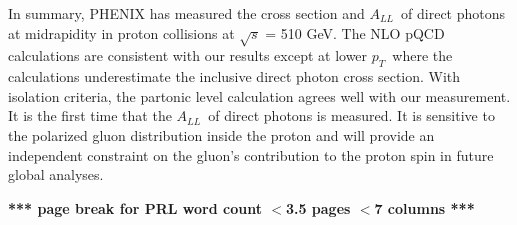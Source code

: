\documentclass[twocolumn,letterpaper,aps,prl,longbibliography,superscriptaddress,floatfix]{revtex4-2}
\newcommand{\pT}{\ensuremath{p_T}}
\newcommand{\ALL}{\ensuremath{A_{LL}}}
\begin{document}
In summary, PHENIX has measured the cross section and \ALL\ of direct photons at midrapidity in proton collisions at $\sqrt{s}$ = 510 GeV. The NLO pQCD calculations are consistent with our results except at lower \pT\ where the calculations underestimate the inclusive direct photon cross section. With isolation criteria, the partonic level calculation agrees well with our measurement. It is the first time that the \ALL\ of direct photons is measured. It is sensitive to the polarized gluon distribution inside the proton and will provide an independent constraint on the gluon’s contribution to the proton spin in future global analyses.

\clearpage \textbf{*** page break for PRL word count $<$3.5 pages $<$7 columns ***}




\end{document}
